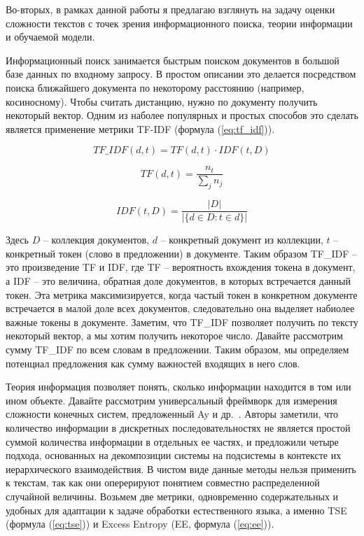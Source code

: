 \documentclass{spbau-diploma}
\begin{document}
Во-вторых, в рамках данной работы я предлагаю взглянуть на задачу оценки сложности текстов с точек зрения информационного поиска, теории информации и обучаемой модели.

Информационный поиск занимается быстрым поиском документов в большой базе данных по входному запросу. В простом описании это делается посредством поиска ближайшего документа по некоторому расстоянию (например, косиносному). Чтобы считать дистанцию, нужно по документу получить некоторый вектор. Одним из наболее популярных и простых способов это сделать является применение метрики TF-IDF (формула (\ref{eq:tf_idf})).

\begin{equation} \label{eq:tf_idf}
TF\_IDF(d,t) = TF(d,t)\cdot IDF(t,D)
\end{equation}

\begin{equation} \label{eq:tf}
TF(d,t) = \frac{n_t}{\sum\limits_{j}n_j}
\end{equation}

\begin{equation} \label{eq:idf}
IDF(t,D) = \frac{|D|}{|\{d\in D\colon t \in d\}|}
\end{equation}

Здесь $D$ -- коллекция документов, $d$ -- конкретный документ из коллекции, $t$ -- конкретный токен (слово в предложении) в документе. Таким образом TF\_IDF -- это произведение TF и IDF, где TF -- вероятность вхождения токена в документ, а IDF -- это величина, обратная доле документов, в которых встречается данный токен. Эта метрика максимизируется, когда частый токен в конкретном документе встречается в малой доле всех документов, следовательно она выделяет набиолее важные токены в документе. Заметим, что TF\_IDF позволяет получить по тексту некоторый вектор, а мы хотим получить некоторое число. Давайте рассмотрим сумму TF\_IDF по всем словам в предложении. Таким образом, мы определяем потенциал предложения как сумму важностей входящих в него слов.

Теория информация позволяет понять, сколько информации находится в том или ином объекте. Давайте рассмотрим универсальный фреймворк для измерения сложности конечных систем, предложенный Ay и др.~\cite{ay2006unifying}. Авторы заметили, что количество информации в дискретных последовательностях не является простой суммой количества информации в отдельных ее частях, и предложили четыре подхода, основанных на декомпозиции системы на подсистемы в контексте их иерархического взаимодействия. В чистом виде данные методы нельзя применить к текстам, так как они оперерируют понятием совместно распределенной случайной величины. Возьмем две метрики, одновременно содержательных и удобных для адаптации к задаче обработки естественного языка, а именно TSE (формула (\ref{eq:tse})) и Excess Entropy (EE, формула (\ref{eq:ee})).
\end{document}
